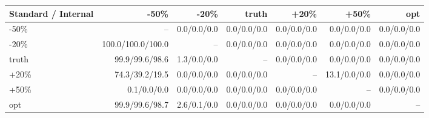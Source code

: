 \begin{tabular}{@{}lrrrrrr@{}}
\toprule
Standard / Internal & -50\% & -20\% & truth & +20\% & +50\% & opt \\
\midrule
-50\% & -- & 0.0/0.0/0.0 & 0.0/0.0/0.0 & 0.0/0.0/0.0 & 0.0/0.0/0.0 & 0.0/0.0/0.0 \\
-20\% & 100.0/100.0/100.0 & -- & 0.0/0.0/0.0 & 0.0/0.0/0.0 & 0.0/0.0/0.0 & 0.0/0.0/0.0 \\
truth & 99.9/99.6/98.6 & 1.3/0.0/0.0 & -- & 0.0/0.0/0.0 & 0.0/0.0/0.0 & 0.0/0.0/0.0 \\
+20\% & 74.3/39.2/19.5 & 0.0/0.0/0.0 & 0.0/0.0/0.0 & -- & 13.1/0.0/0.0 & 0.0/0.0/0.0 \\
+50\% & 0.1/0.0/0.0 & 0.0/0.0/0.0 & 0.0/0.0/0.0 & 0.0/0.0/0.0 & -- & 0.0/0.0/0.0 \\
opt & 99.9/99.6/98.7 & 2.6/0.1/0.0 & 0.0/0.0/0.0 & 0.0/0.0/0.0 & 0.0/0.0/0.0 & -- \\
\bottomrule
\end{tabular}
